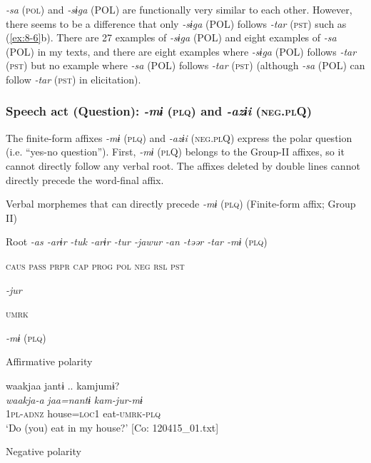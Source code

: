 \textit{-sa} (\textsc{pol}) and \textit{-sɨga} (POL) are functionally very similar to each other. However, there seems to be a difference that only \textit{-sɨga} (POL) follows \textit{-tar} (\textsc{pst}) such as (\ref{ex:8-6}b). There are 27 examples of \textit{-sɨga} (POL) and eight examples of \textit{-sa} (POL) in my texts, and there are eight examples where \textit{-sɨga} (POL) follows \textit{-tar} (\textsc{pst}) but no example where \textit{-sa} (POL) follows \textit{-tar} (\textsc{pst}) (although \textit{-sa} (POL) can follow \textit{-tar} (\textsc{pst}) in elicitation).

\subsubsection{Speech act (Question): \textit{-mɨ} (\textsc{plq}) and \textit{-azɨi} (\textsc{neg}.\textsc{pl}Q)}

The finite-form affixes \textit{-mɨ} (\textsc{plq}) and \textit{-azɨi} (\textsc{neg}.\textsc{pl}Q) express the polar question (i.e. “yes-no question”).   First, \textit{-mɨ} (\textsc{pl}Q) belongs to the Group-II affixes, so it cannot directly follow any verbal root. The affixes deleted by double lines cannot directly precede the word-final affix.

\ea\label{ex:8-65}
  Verbal morphemes that can directly precede \textit{-mɨ} (\textsc{plq}) (Finite-form affix; Group II)

  Root  \textit{-as  -arɨr} %
\textit{-tuk  -arɨr  -tur  -jawur} %
\textit{-an  -təər  -tar  -mɨ} (\textsc{plq})

    \textsc{caus}  \textsc{pass}  \textsc{prpr}  \textsc{cap}  \textsc{prog}  \textsc{pol}  \textsc{neg}  \textsc{rsl}  \textsc{pst}

          \textit{-jur}

          \textsc{umrk}
\z

\ea\label{ex:8-66}
  \textit{-mɨ} (\textsc{plq})

\ea Affirmative polarity

  {\TM}
\glll  waakjaa  jantɨ ..  kamjumɨ?\\
\textit{waakja-a}  \textit{jaa=nantɨ}  \textit{kam-jur-mɨ}\\
    1\textsc{pl}-\textsc{adnz}  house=\textsc{loc1}  eat-\textsc{umrk}-\textsc{plq}\\
\glt ‘Do (you) eat in my house?’ [Co: 120415\_01.txt]


\ex Negative polarity


